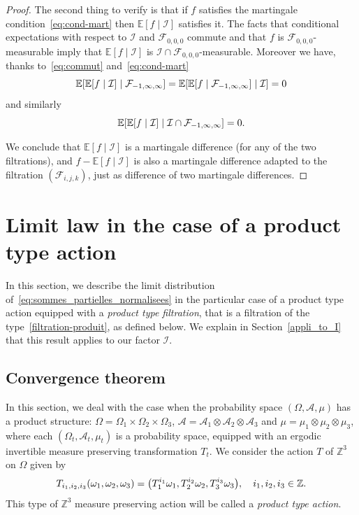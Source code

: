 \documentclass[AHL,Unicode,longabstracts,published]{cedram}
\newcommand{\Z}{\mathbb{Z}}
\newcommand{\bbE}{\mathbb{E}}
\newcommand{\E}[1]{\bbE\left[#1\right]}
\newcommand*\I{\mathcal{I}}
\newcommand*\F{\mathcal{F}}
\newcommand{\Aca}{\mathcal{A}}
\newcommand{\pr}[1]{\left(#1\right)}
\let\originalleft\left
\let\originalright\right
\renewcommand{\left}{\mathopen{}\mathclose\bgroup\originalleft}
\renewcommand{\right}{\aftergroup\egroup\originalright}
\begin{document}
\begin{proof}
The second thing to verify is that if $f$ satisfies the martingale condition~\eqref{eq:cond-mart} then $\bbE[f\mid\I]$ satisfies it. The facts that conditional expectations with respect to $\I$ and $\F_{0,0,0}$ commute and that $f$ is $\F_{0,0,0}$-measurable imply that $\bbE[f\mid\I]$ is $\I\cap\F_{0,0,0}$-measurable. Moreover we have, thanks to~\eqref{eq:commut} and~\eqref{eq:cond-mart}
\[
\E{\E{f\mid\I}\mid\F_{-1,\infty,\infty}}=\E{\E{f\mid\F_{-1,\infty,\infty}}\mid\I}=0
\]
and similarly
\[
\E{\E{f\mid\I}\mid\I\cap\F_{-1,\infty,\infty}}=0.
\]

We conclude that $\bbE[f\mid\I]$ is a martingale difference (for any of the two filtrations), and $f-\bbE[f\mid\I]$ is also a martingale difference adapted to the filtration $(\F_{i,j,k})$, just as difference of two martingale differences.
\end{proof}


\section{Limit law in the case of a product type action}\label{product-type CLT}

In this section, we describe the limit distribution of~\eqref{eq:sommes_partielles_normalisees} in the particular case of a product type action equipped with a \emph{product type filtration}, that is a filtration of the type~\eqref{filtration-produit}, as defined below. We explain in Section~\ref{appli_to_I} that this result applies to our factor $\I$.

\subsection{Convergence theorem}

In this section, we deal with the case when {the probability space $(\Omega,\Aca,\mu)$ has a product structure: $\Omega=\Omega_1\times\Omega_2\times\Omega_3$, $\Aca=\Aca_1\otimes\Aca_2\otimes\Aca_3$ and $\mu=\mu_1\otimes\mu_2\otimes\mu_3$, where each $(\Omega_t,\Aca_t,\mu_t)$ is a probability space, equipped with an ergodic invertible measure preserving transformation $T_t$. We consider the action $T$ of $\Z^3$ on $\Omega$ given by
\begin{equation*}
T_{i_1,i_2,i_3}\pr{\omega_1,\omega_2,\omega_3}=
\pr{T_1^{i_1}\omega_1,T_2^{i_2}\omega_2,T_3^{i_3}\omega_3},\quad i_1,i_2,i_3\in\Z.
\end{equation*}
This type of $\Z^3$ measure preserving action will be called a \emph{product type action}.}
\end{document}
